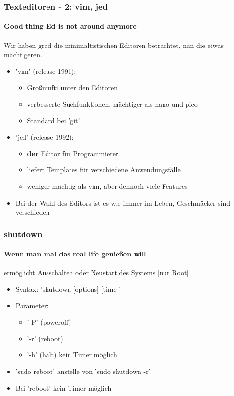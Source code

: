 \documentclass[12pt,utf8, handout]{beamer}
\begin{document}
\begin{frame}
\frametitle{Texteditoren - 2: vim, jed}
\framesubtitle{Good thing Ed is not around anymore}
Wir haben grad die minimaltistischen Editoren betrachtet, nun die etwas mächtigeren.
\begin{itemize}
	\item 'vim' (release 1991):
	\begin{itemize}[<+->]
		\item Großmufti unter den Editoren
		\item verbesserte Suchfunktionen, mächtiger als nano und pico
		\item Standard bei 'git'
	\end{itemize}
	\item 'jed' (release 1992):
	\begin{itemize}[<+->]
		\item \textbf{der} Editor für Programmierer
		\item liefert Templates für verschiedene Anwendungsfälle
		\item weniger mächtig als vim, aber dennoch viele Features
	\end{itemize}
	\item Bei der Wahl des Editors ist es wie immer im Leben, Geschmäcker sind verschieden
\end{itemize}
\end{frame}

\begin{frame}
\frametitle{shutdown}
\framesubtitle{Wenn man mal das real life genießen will}
ermöglicht Ausschalten oder Neustart des Systems [nur Root]
\begin{itemize}[<+->]
	\item Syntax: 'shutdown [options] [time]'
	\item Parameter:
	\begin{itemize}[<+->]
		\item '-P' (poweroff)
		\item '-r' (reboot) 
		\item '-h' (halt) kein Timer möglich
	\end{itemize}
	\item 'sudo reboot' anstelle von 'sudo shutdown -r'
	\item Bei 'reboot' kein Timer möglich
\end{itemize}
\end{frame}
\end{document}
